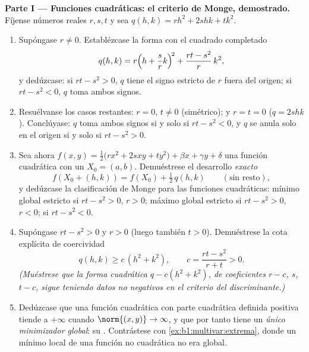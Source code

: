 \begin{problem}
\medskip
\noindent\textbf{Parte I --- Funciones cuadráticas: el criterio de Monge,
demostrado.} Fíjense números reales $r, s, t$ y sea $q(h, k) = r h^2 + 2s hk +
t k^2$.
\begin{enumerate}
  \item Supóngase $r \neq 0$. Establézcase la forma con el cuadrado completado
        \[
        q(h, k) = r\Bigl(h + \frac{s}{r}k\Bigr)^{\!2}
        + \frac{rt - s^2}{r}\,k^2 ,
        \]
        y dedúzcase: si $rt - s^2 > 0$, $q$ tiene el signo estricto
        de $r$ fuera del origen; si $rt - s^2 < 0$, $q$ toma ambos
        signos.
  \item Resuélvanse los casos restantes: $r = 0$, $t \neq 0$
        (simétrico); y $r = t = 0$ ($q = 2shk$). Conclúyase:
        $q$ toma ambos signos si y solo si $rt - s^2 < 0$, y $q$
        se anula solo en el origen si y solo si $rt - s^2 > 0$.
  \item Sea ahora $f(x, y) = \frac12\bigl(r x^2 + 2s xy + t
        y^2\bigr) + \beta x + \gamma y + \delta$ una función cuadrática
        con un  $X_0 = (a, b)$. Demuéstrese el
        desarrollo \emph{exacto}
        \[
        f(X_0 + (h,k)) = f(X_0) + \tfrac12\,q(h, k)
        \qquad (\text{sin resto}),
        \]
        y dedúzcase la clasificación de Monge para las funciones
        cuadráticas: mínimo global estricto si $rt - s^2 > 0$, $r >
        0$; máximo global estricto si $rt - s^2 > 0$, $r < 0$;
         si $rt - s^2 < 0$.
  \item Supóngase $rt - s^2 > 0$ y $r > 0$ (luego también $t > 0$).
        Demuéstrese la cota explícita de coercividad
        \[
        q(h, k) \geq c\,(h^2 + k^2),
        \qquad
        c = \frac{rt - s^2}{r + t} > 0 .
        \]
        \emph{(Muéstrese que la forma cuadrática $q - c(h^2 + k^2)$,
        de coeficientes $r - c$, $s$, $t - c$, sigue teniendo
        datos no negativos en el criterio del discriminante.)}
  \item Dedúzcase que una función cuadrática con parte cuadrática
        definida positiva tiende a $+\infty$ cuando $\norm{(x,y)} \to
        \infty$, y que por tanto tiene un \emph{único minimizador
        global}: su . Contrástese con
        \cref{ex:b1:multivar:extrema}, donde un mínimo local de
        una función no cuadrática no era global.
\end{enumerate}


\end{problem}
